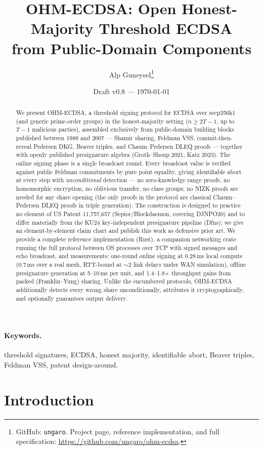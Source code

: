 \documentclass[11pt]{article}
\title{\textbf{OHM-ECDSA: Open Honest-Majority Threshold ECDSA\\from Public-Domain Components}}
\author{Alp Guneysel\thanks{GitHub: \texttt{ungaro}. Project page, reference implementation, and full specification: \url{https://github.com/ungaro/ohm-ecdsa}.}}
\date{Draft v0.8 --- \today}
\theoremstyle{plain}
\theoremstyle{definition}
\theoremstyle{remark}
\begin{document}
\maketitle

\begin{abstract}
We present OHM-ECDSA, a threshold signing protocol for ECDSA over secp256k1 (and generic prime-order groups) in the honest-majority setting ($n \geq 2T{-}1$, up to $T{-}1$ malicious parties), assembled exclusively from public-domain building blocks published between 1989 and 2007 --- Shamir sharing, Feldman VSS, commit-then-reveal Pedersen DKG, Beaver triples, and Chaum--Pedersen DLEQ proofs --- together with openly published presignature algebra (Groth--Shoup 2021, Katz 2023). The online signing phase is a single broadcast round. Every broadcast value is verified against public Feldman commitments by pure point equality, giving identifiable abort at every step with \emph{unconditional} detection --- no zero-knowledge range proofs, no homomorphic encryption, no oblivious transfer, no class groups; no NIZK proofs are needed for any share opening (the only proofs in the protocol are classical Chaum--Pedersen DLEQ proofs in triple generation). The construction is designed to practice no element of US Patent 11,757,657 (Sepior/Blockdaemon, covering DJNPO20) and to differ materially from the KU24 key-independent presignature pipeline (Dfns); we give an element-by-element claim chart and publish this work as defensive prior art. We provide a complete reference implementation (Rust), a companion networking crate running the full protocol between OS processes over TCP with signed messages and echo broadcast, and measurements: one-round online signing at 0.28\,ms local compute (0.7\,ms over a real mesh, RTT-bound at $\sim$2 link delays under WAN simulation), offline presignature generation at 5--10\,ms per unit, and 1.4--1.8$\times$ throughput gains from packed (Franklin--Yung) sharing. Unlike the encumbered protocols, OHM-ECDSA additionally detects every wrong share unconditionally, attributes it cryptographically, and optionally guarantees output delivery.
\end{abstract}

\paragraph{Keywords.} threshold signatures, ECDSA, honest majority, identifiable abort, Beaver triples, Feldman VSS, patent design-around.

\section{Introduction}
\end{document}
